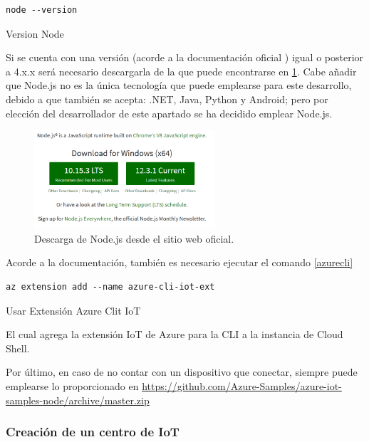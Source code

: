 \documentclass[english,runningheads,a4paper]{llncs}[2018/03/10]
\begin{document}
\begin{listing}[htp]
\centering
    \begin{verbatim} 
node --version
    \end{verbatim}
\caption{Version Node}
\label{command}
\end{listing}

Si se cuenta con una versión (acorde a la documentación oficial
\cite{azure_iot}) igual o posterior a 4.x.x será necesario descargarla de la
que puede encontrarse en \cite{node} 
\hyperref[downloadnode]{\ref{downloadnode}}. Cabe añadir que Node.js no es la 
única tecnología que puede emplearse para este desarrollo, debido a que también
se acepta: .NET, Java, Python y Android; pero por elección del desarrollador de
este apartado se ha decidido emplear Node.js.

\begin{figure}[h!]
 \centering
 \includegraphics[width=0.6\textwidth]{./IoT/MicrosoftAzure/4-3-1_send_simulated_telemetry.png}
 \caption{Descarga de Node.js desde el sitio web oficial.}
 \label{downloadnode}
\end{figure}

Acorde a la documentación, también es necesario ejecutar el comando
\hyperref[azurecli]{\ref{azurecli}}

\begin{listing}[htp]
\centering
    \begin{verbatim} 
az extension add --name azure-cli-iot-ext
    \end{verbatim}
\caption{Usar Extensión Azure Clit IoT}
\label{azurecli}
\end{listing}

El cual agrega la extensión IoT de Azure para la CLI a la instancia de Cloud
Shell.

Por último, en caso de no contar con un dispositivo que conectar, siempre puede
emplearse lo proporcionado en 
\url{https://github.com/Azure-Samples/azure-iot-samples-node/archive/master.zip}

\subsubsection{Creación de un centro de IoT}
\end{document}
